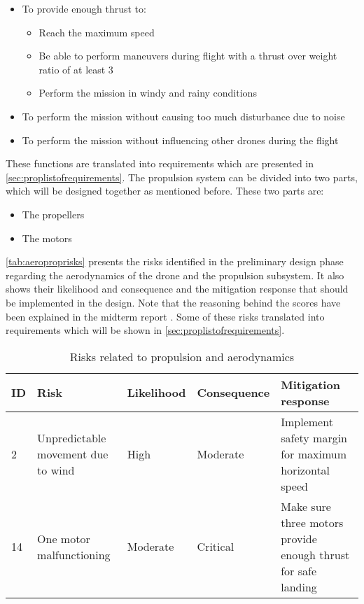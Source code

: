 \begin{itemize}[noitemsep,nolistsep]
    \item To provide enough thrust to:
    \begin{itemize}[noitemsep,nolistsep]
        \item Reach the maximum speed
        \item Be able to perform maneuvers during flight with a thrust over weight ratio of at least 3
        \item Perform the mission in windy and rainy conditions

    \end{itemize}
    \item To perform the mission without causing too much disturbance due to noise
    \item To perform the mission without influencing other drones during the flight
\end{itemize}

These functions are translated into requirements which are presented in \autoref{sec:proplistofrequirements}. The propulsion system can be divided into two parts, which will be designed together as mentioned before. These two parts are:
\begin{itemize}[noitemsep,nolistsep]
    \item The propellers
    \item The motors
\end{itemize}

\autoref{tab:aeroproprisks} presents the risks identified in the preliminary design phase regarding the aerodynamics of the drone and the propulsion subsystem. It also shows their likelihood and consequence and the mitigation response that should be implemented in the design. Note that the reasoning behind the scores have been explained in the midterm report \cite{midterm}. Some of these risks translated into requirements which will be shown in \autoref{sec:proplistofrequirements}.

\begin{table}[H]
\centering
\caption{Risks related to propulsion and aerodynamics}
\label{tab:aeroproprisks}
\begin{tabular}{|p{}|p{4cm}|p{}|p{}|p{6cm}|}
\hline
\textbf{ID} & \textbf{Risk}                       & \textbf{Likelihood} & \textbf{Consequence} & \textbf{Mitigation response}                                      \\ \hline
2           & Unpredictable movement due to wind  & High                & Moderate             & Implement safety margin for maximum horizontal speed              \\ \hline
14          & One motor malfunctioning            & Moderate            & Critical             & Make sure three motors provide enough thrust for safe landing     \\ \hline
\end{tabular}
\end{table}



